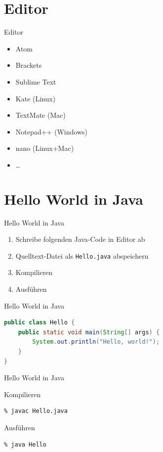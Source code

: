 \documentclass[18pt]{beamer}
\begin{document}
\section{Editor}

\begin{frame}{Editor}
    \begin{itemize}
        \pause
        \item Atom
        \pause
        \item Brackets
        \pause
        \item Sublime Text
        \pause
        \item Kate (Linux)
        \pause
        \item TextMate (Mac)
        \pause
        \item Notepad++ (Windows)
        \pause
        \item nano (Linux+Mac)
        \pause
        \item \dots
    \end{itemize}
\end{frame}

\section{Hello World in Java}

\begin{frame}{Hello World in Java}
    \begin{enumerate}
        \item Schreibe folgenden Java-Code in Editor ab
        \item Quelltext-Datei als \texttt{Hello.java} abspeichern
        \item Kompilieren
        \item Ausführen
    \end{enumerate}
\end{frame}

\begin{frame}[fragile]{Hello World in Java}
    \begin{lstlisting}[language=Java]
public class Hello {
    public static void main(String[] args) {
        System.out.println("Hello, world!");
    }
}
    \end{lstlisting}
\end{frame}

\begin{frame}[fragile]{Hello World in Java}
    \begin{block}{Kompilieren}
        \begin{lstlisting}
% javac Hello.java
        \end{lstlisting}
    \end{block}
    \pause
    \begin{block}{Ausführen}
        \begin{lstlisting}
% java Hello
        \end{lstlisting}
    \end{block}
\end{frame}
\end{document}
